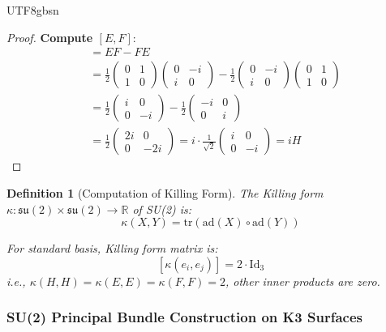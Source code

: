 \documentclass[a4paper,12pt]{extarticle}
\newtheorem{definition}[theorem]{Definition}
\theoremstyle{definition}
\begin{document}
\begin{CJK}{UTF8}{gbsn}
\begin{proof}
\textbf{Compute $[E, F]$}:
\begin{align}
[E, F] &= EF - FE\\
&= \frac{1}{2}\begin{pmatrix} 0 & 1 \\ 1 & 0 \end{pmatrix}\begin{pmatrix} 0 & -i \\ i & 0 \end{pmatrix} - \frac{1}{2}\begin{pmatrix} 0 & -i \\ i & 0 \end{pmatrix}\begin{pmatrix} 0 & 1 \\ 1 & 0 \end{pmatrix}\\
&= \frac{1}{2}\begin{pmatrix} i & 0 \\ 0 & -i \end{pmatrix} - \frac{1}{2}\begin{pmatrix} -i & 0 \\ 0 & i \end{pmatrix}\\
&= \frac{1}{2}\begin{pmatrix} 2i & 0 \\ 0 & -2i \end{pmatrix} = i \cdot \frac{1}{\sqrt{2}}\begin{pmatrix} i & 0 \\ 0 & -i \end{pmatrix} = iH
\end{align}
\end{proof}

\begin{definition}[Computation of Killing Form]
\label{def:killing_form_su2}
The Killing form $\kappa: \mathfrak{su}(2) \times \mathfrak{su}(2) \to \mathbb{R}$ of SU(2) is:
$$\kappa(X, Y) = \text{tr}(\text{ad}(X) \circ \text{ad}(Y))$$

For standard basis, Killing form matrix is:
$$[\kappa(e_i, e_j)] = 2 \cdot \text{Id}_3$$
i.e., $\kappa(H, H) = \kappa(E, E) = \kappa(F, F) = 2$, other inner products are zero.
\end{definition}

\subsubsection{SU(2) Principal Bundle Construction on K3 Surfaces}
\label{subsubsec:su2_principal_bundle}


\end{CJK}
\end{document}
